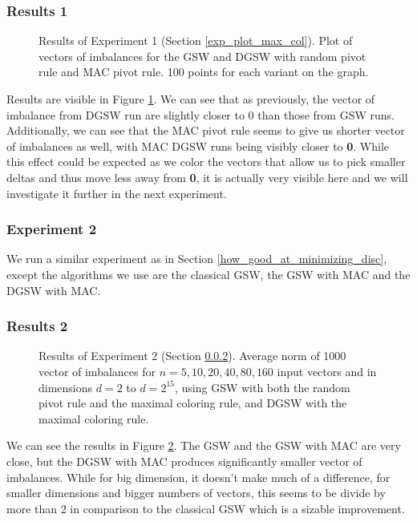 \documentclass[12pt]{article}
\begin{document}
\subsubsection{Results 1}
\begin{figure}[h]
\centering

\caption{Results of Experiment 1 (Section \ref{exp_plot_max_col}). Plot of vectors of imbalances for the GSW and DGSW with random pivot rule and MAC pivot rule. 100 points for each variant on the graph.}
\label{results_plot_max_col}
\end{figure}
Results are visible in Figure \ref{results_plot_max_col}. We can see that as previously, the vector of imbalance from DGSW run are slightly closer to 0 than those from GSW runs. Additionally, we can see that the MAC pivot rule seems to give us shorter vector of imbalances as well, with MAC DGSW runs being visibly closer to \textbf{0}. While this effect could be expected as we color the vectors that allow us to pick smaller deltas and thus move less away from \textbf{0}, it is actually very visible here and we will investigate it further in the next experiment.

\subsubsection{Experiment 2}\label{exp_norms_max_col}
We run a similar experiment as in Section \ref{how_good_at_minimizing_disc}, except the algorithms we use are the classical GSW, the GSW with MAC and the DGSW with MAC.
\subsubsection{Results 2}
\begin{figure}[h]
\centering

\caption{Results of Experiment 2 (Section \ref{exp_norms_max_col}). Average norm of 1000 vector of imbalances for $n=5,10,20,40,80,160$ input vectors and in dimensions $d=2$ to $d=2^{15}$, using GSW with both the random pivot rule and the maximal coloring rule, and DGSW with the maximal coloring rule.}
\label{results_plot_max_col_norms}
\end{figure}
We can see the results in Figure \ref{results_plot_max_col_norms}. The GSW and the GSW with MAC are very close, but the DGSW with MAC produces significantly smaller vector of imbalances. While for big dimension, it doesn't make much of a difference, for smaller dimensions and bigger numbers of vectors, this seems to be divide by more than 2 in comparison to the classical GSW which is a sizable improvement.
\end{document}
